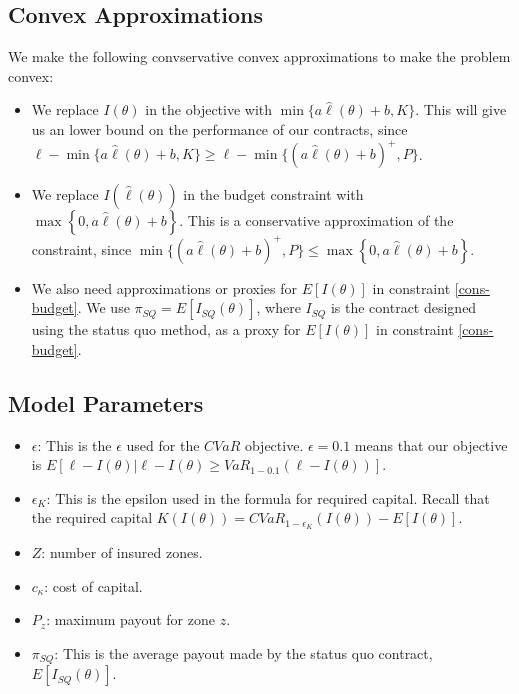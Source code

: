 \documentclass[11pt]{article}
\begin{document}
  \subsection{Convex Approximations}
    We make the following convservative convex approximations to make the problem convex: 
    \begin{itemize}
        \item We replace $I(\theta)$ in the objective with $\min \{ a\hat{\ell}(\theta) + b,K \}$. This will give us an lower bound on the performance of our contracts, since $\ell - \min \{ a\hat{\ell}(\theta) + b,K \} \geq  \ell - \min \{ (a\hat{\ell}(\theta) + b)^+,P \}$.
        \item We replace $I(\hat{\ell}(\theta))$ in the budget constraint with $\max \left \{ 0,a\hat{\ell}(\theta) + b \right \} $. This is a conservative approximation of the constraint, since $\min \{ (a\hat{\ell}(\theta) + b)^+,P \}  \leq \max \left \{ 0,a\hat{\ell}(\theta) + b \right \}$.
        \item We also need approximations or proxies for $E[I(\theta)]$ in constraint \ref{cons-budget}. We use $\pi_{SQ} = E[I_{SQ}(\theta)]$, where $I_{SQ}$ is the contract designed using the status quo method, as a proxy for $E[I(\theta)]$ in constraint \ref{cons-budget}.
    \end{itemize}

  \subsection{Model Parameters}
    \begin{itemize}
        \item $\epsilon$: This is the $\epsilon$ used for the $CVaR$ objective.  $\epsilon = 0.1$ means that our objective is $E[\ell - I(\theta)|\ell -I(\theta) \geq VaR_{1-0.1}\left ( \ell - I(\theta) \right )]$.  
        \item $\epsilon_K$: This is the epsilon used in the formula for required capital. Recall that the required capital $K(I(\theta)) = CVaR_{1-\epsilon_K}(I(\theta)) - E[I(\theta)]$. 
        \item $Z$: number of insured zones.
        \item $c_{\kappa}$: cost of capital. 
        \item $P_z$: maximum payout for zone $z$.
        \item $\pi_{SQ}$: This is the average payout made by the status quo contract, $E[I_{SQ}(\theta)]$.   
    \end{itemize}
\end{document}
